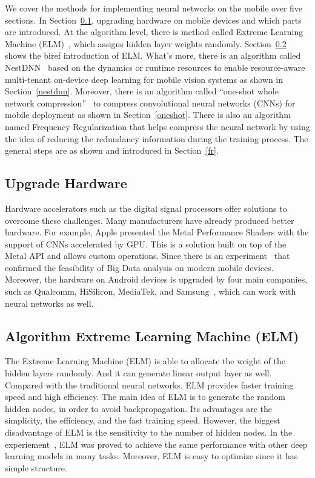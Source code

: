 \documentclass{article}
\begin{document}
We cover the methods for implementing neural networks on the mobile over five sections. In Section~\ref{upgrade_hardware}, upgrading hardware on mobile devices and which parts are introduced. At the algorithm level, there is method called Extreme Learning Machine (ELM)~\cite{akusok2019metal}, which assigns hidden layer weights randomly. Section~\ref{elm} shows the biref introduction of ELM. What's more, there is an algorithm called NestDNN~\cite{fang2018nestdnn} based on the dynamics or runtime resources to enable resource-aware multi-tenant on-device deep learning for mobile vision systems as shown in Section~\ref{nestdnn}. Moreover, there is an algorithm called “one-shot whole network compression”~\cite{kim2016compression} to compress convolutional neural networks (CNNs) for mobile deployment as shown in Section~\ref{oneshot}. There is also an algorithm named Frequency Regularization that helps compress the neural network by using the idea of reducing the redundancy information during the training process. The general steps are as shown and introduced in Section~\ref{fr}.

\subsection{Upgrade Hardware}\label{upgrade_hardware}
Hardware accelerators such as the digital signal processors offer solutions to overcome these challenges. Many manufacturers have already produced better hardware. For example, Apple presented the Metal Performance Shaders with the support of CNNs accelerated by GPU. This is a solution built on top of the Metal API and allows custom operations. Since there is an experiment~\cite{akusok2019metal} that confirmed the feasibility of Big Data analysis on modern mobile devices. Moreover, the hardware on Android devices is upgraded by four main companies, such as Qualcomm, HiSilicon, MediaTek, and Samsung~\cite{Andrey2019Aibenchmark}, which can work with neural networks as well.

\subsection{Algorithm Extreme Learning Machine (ELM)}\label{elm}
The Extreme Learning Machine (ELM) is able to allocate the weight of the hidden layers randomly.  And it can generate linear output layer as well. Compared with the traditional neural networks, ELM provides faster training speed and high efficiency. The main idea of ELM is to generate the random hidden nodes, in order to avoid backpropagation. Its advantages are the simplicity, the efficiency, and the fast training speed. However, the biggest disadvantage of ELM is the sensitivity to the number of hidden nodes. In the experiement~\cite{akusok2019metal}, ELM was proved to achieve the same performance with other deep learning models in many tasks. Moreover, ELM is easy to optimize since it has simple structure.
\end{document}
